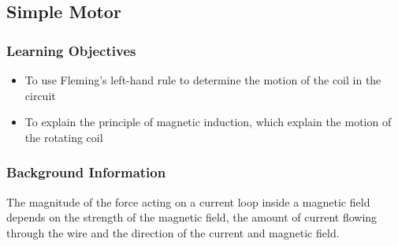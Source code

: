 %



\subsection{Simple Motor}

\subsubsection*{Learning Objectives}
\begin{itemize}
\item{To use Fleming's left-hand rule to determine the motion of the coil in the circuit} 
\item{To explain the principle of magnetic induction, which explain the motion of the rotating coil} 
\end{itemize}

\subsubsection*{Background Information}
The magnitude of the force acting on a current loop inside a magnetic field depends on the strength of the magnetic field, the amount of current flowing through the wire and the direction of the current and magnetic field.  

